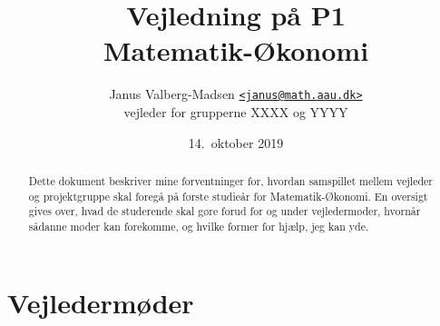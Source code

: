 \documentclass[12pt,a4paper,oneside,final]{article}
\title{
  Vejledning på P1\\
  Matematik-{\O}konomi
}
\author{
  Janus Valberg-Madsen \href{mailto:janus@math.aau.dk}{\texttt{<janus@math.aau.dk>}}\\
  vejleder for grupperne XXXX og YYYY
}
\date{14.\ oktober 2019}
\begin{document}
\maketitle

\renewcommand{\abstractname}{Om dette dokument}
\begin{abstract}
  Dette dokument beskriver mine forventninger for, hvordan samspillet mellem vejleder og projektgruppe skal foregå på første studieår for Matematik-Økonomi.
  En oversigt gives over, hvad de studerende skal gøre forud for og under vejledermøder, hvornår sådanne møder kan forekomme, og hvilke former for hjælp, jeg kan yde.
\end{abstract}


\section{Vejledermøder}
\end{document}
